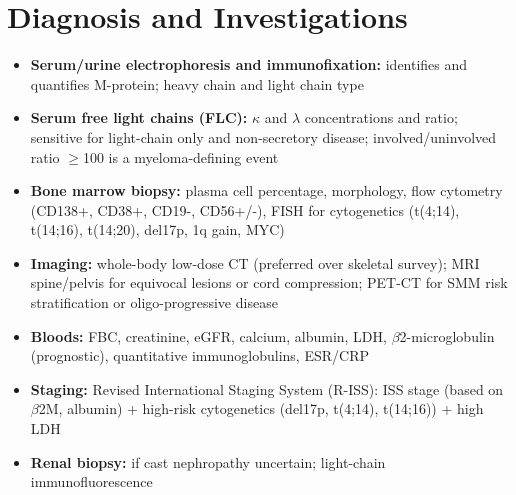\section*{Diagnosis and Investigations}
\begin{itemize}
    \item \textbf{Serum/urine electrophoresis and immunofixation:} identifies and quantifies M-protein; heavy chain and light chain type
    \item \textbf{Serum free light chains (FLC):} $\kappa$ and $\lambda$ concentrations and ratio; sensitive for light-chain only and non-secretory disease; involved/uninvolved ratio $\ge$100 is a myeloma-defining event
    \item \textbf{Bone marrow biopsy:} plasma cell percentage, morphology, flow cytometry (CD138+, CD38+, CD19-, CD56+/-), FISH for cytogenetics (t(4;14), t(14;16), t(14;20), del17p, 1q gain, MYC)
    \item \textbf{Imaging:} whole-body low-dose CT (preferred over skeletal survey); MRI spine/pelvis for equivocal lesions or cord compression; PET-CT for SMM risk stratification or oligo-progressive disease
    \item \textbf{Bloods:} FBC, creatinine, eGFR, calcium, albumin, LDH, $\beta$2-microglobulin (prognostic), quantitative immunoglobulins, ESR/CRP
    \item \textbf{Staging:} Revised International Staging System (R-ISS): ISS stage (based on $\beta$2M, albumin) + high-risk cytogenetics (del17p, t(4;14), t(14;16)) + high LDH
    \item \textbf{Renal biopsy:} if cast nephropathy uncertain; light-chain immunofluorescence
\end{itemize}


